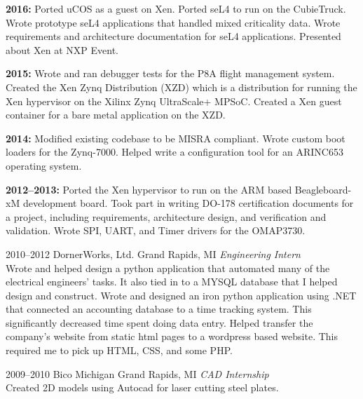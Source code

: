 \documentclass[a4paper]{cv-friggeri-x}
\begin{document}
\begin{entrylist}
\smallentry
{\textbf{2016:} Ported uCOS as a guest on Xen. Ported seL4 to run on the CubieTruck. Wrote prototype seL4 applications that handled mixed criticality data. Wrote requirements and architecture documentation for seL4 applications. Presented about Xen at NXP Event.}

\smallentry
{\textbf{2015:} Wrote and ran debugger tests for the P8A flight management system. Created the Xen Zynq Distribution (XZD) which is a distribution for running the Xen hypervisor on the Xilinx Zynq UltraScale+ MPSoC. Created a Xen guest container for a bare metal application on the XZD.}

\smallentry
{\textbf{2014:} Modified existing codebase to be MISRA compliant. Wrote custom boot loaders for the Zynq-7000. Helped write a configuration tool for an ARINC653 operating system.}

\smallentry
{\textbf{2012--2013:} Ported the Xen hypervisor to run on the ARM based Beagleboard-xM development board. Took part in writing DO-178 certification documents for a project, including requirements, architecture design, and verification and validation. Wrote SPI, UART, and Timer drivers for the OMAP3730.}

\entry
{2010--2012}
{DornerWorks, Ltd.}
{Grand Rapids, MI}
{\emph{Engineering Intern}\\
Wrote and helped design a python application that automated many of the electrical engineers' tasks. It also tied in to a MYSQL database that I helped design and construct.}
\smallentry
{Wrote and designed an iron python application using .NET that connected an accounting database to a time tracking system. This significantly decreased time spent doing data entry.}
\smallentry
{Helped transfer the company's website from static html pages to a wordpress based website. This required me to pick up HTML, CSS, and some PHP.}


\entry
{2009--2010}
{Bico Michigan}
{Grand Rapids, MI}
{\emph{CAD Internship} \\
Created 2D models using Autocad for laser cutting steel plates.}


\end{entrylist}

\end{document}
